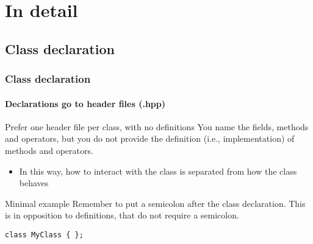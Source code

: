 \section{In detail}

\subsection{Class declaration}

\begin{frame}[fragile]
\frametitle{Class declaration}
\framesubtitle{Declarations go to header files (.hpp)}

\begin{block}{Prefer one header file per class, with no definitions}
You name the fields, methods and operators, but you do not provide the definition (i.e., implementation) of methods and operators.
\begin{itemize}
\item In this way, how to interact with the class is separated from how the class behaves
\end{itemize}
\end{block}
\pause
\begin{block}{Minimal example}
Remember to put a semicolon after the class declaration. This is in opposition to definitions, that do not require a semicolon.
\begin{verbatim}
class MyClass { };
\end{verbatim}
\end{block}

\end{frame}


